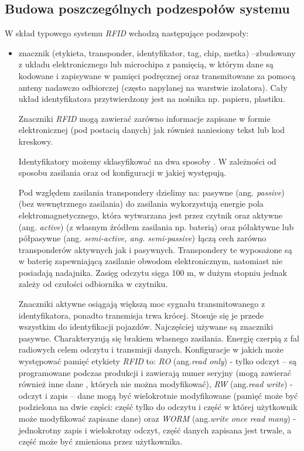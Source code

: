 \subsection{Budowa poszczególnych podzespołów systemu}

W skład typowego systemu \emph{RFID} wchodzą następujące podzespoły:

\begin{itemize}\setlength{\itemsep}{0pt}
	\item znacznik  (etykieta, transponder, identyfikator, tag, chip, metka) –zbudowany z układu elektronicznego lub microchipa z pamięcią, w którym dane są  kodowane i zapisywane w pamięci podręcznej oraz transmitowane za pomocą anteny nadawczo odbiorczej (często napylanej na warstwie izolatora). Cały układ identyfikatora przytwierdzony jest na nośnika np. papieru, plastiku. 

	Znaczniki \emph{RFID} mogą zawierać zarówno informacje zapisane w formie elektronicznej (pod postacią danych) jak również naniesiony tekst lub kod kreskowy. 

	Identyfikatory możemy sklasyfikować na dwa sposoby . W zależności od sposobu zasilania oraz od konfiguracji w jakiej występują.

	Pod względem zasilania transpondery dzielimy na: pasywne  (ang. \emph{passive}) (bez wewnętrznego zasilania) do zasilania  wykorzystują energie pola elektromagnetycznego, która wytwarzana jest przez czytnik oraz aktywne (ang. \emph{active}) (z własnym źródłem zasilania np. baterią) oraz półaktywne lub półpasywne (ang. \emph{semi-active, ang. semi-passive}) łączą cech zarówno transponderów aktywnych jak i pasywnych. Transpondery te wyposażone są w baterię zapewniającą zasilanie obwodom elektronicznym, natomiast nie posiadają nadajnika. Zasięg odczytu sięga 100 m, w dużym stopniu jednak zależy od czułości odbiornika w czytniku.  

	Znaczniki aktywne osiągają większą moc sygnału transmitowanego z identyfikatora, ponadto transmisja trwa krócej. Stosuje się je przede wszystkim do identyfikacji pojazdów. Najczęściej używane są znaczniki pasywne. Charakteryzują się brakiem własnego zasilania. Energię czerpią z fal radiowych celem odczytu i transmisji danych.  Konfiguracje w jakich może występować pamięć etykiety \emph{RFID} to: \emph{RO} (ang.\emph{read only}) - tylko odczyt – są programowane podczas produkcji i zawierają numer seryjny (mogą zawierać również inne dane , których nie można modyfikować), \emph{RW} (ang.\emph{read write}) - odczyt i zapis – dane mogą być wielokrotnie modyfikowane (pamięć może być podzielona na dwie części: część tylko do odczytu i część w której użytkownik może modyfikować zapisane dane) oraz \emph{WORM} (ang.\emph{write once read many}) -jednokrotny zapis i wielokrotny odczyt, część danych zapisana jest trwale, a część może być zmieniona przez użytkownika.
	

\end{itemize}
